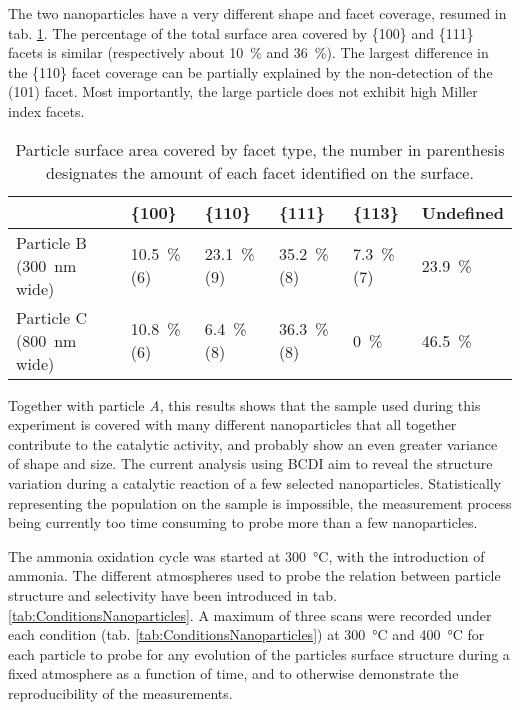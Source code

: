The two nanoparticles have a very different shape and facet coverage, resumed in tab. \ref{tab:FacetCoverage}.
The percentage of the total surface area covered by \{100\} and \{111\} facets is similar (respectively about \qty{10}{\percent} and \qty{36}{\percent}).
The largest difference in the \{110\} facet coverage can be partially explained by the non-detection of the (101) facet.
Most importantly, the large particle does not exhibit high Miller index facets.

\begin{table}[!htb]
    \centering
    \begin{tabular}{@{}llllll@{}}
    \toprule
        & \{100\} & \{110\} & \{111\} & \{113\} & Undefined \\
    \midrule
    Particle B (\qty{300}{\nm} wide) & \qty{10.5}{\percent} (6) & \qty{23.1}{\percent} (9) & \qty{35.2}{\percent} (8) & \qty{7.3}{\percent} (7) & \qty{23.9}{\percent} \\
    Particle C (\qty{800}{\nm} wide) & \qty{10.8}{\percent} (6) &  \qty{6.4}{\percent} (8) & \qty{36.3}{\percent} (8) & \qty{0}{\percent}       & \qty{46.5}{\percent} \\
    \bottomrule
    \end{tabular}%
    \caption{
        Particle surface area covered by facet type, the number in parenthesis designates the amount of each facet identified on the surface.
    }
    \label{tab:FacetCoverage}
\end{table}

Together with particle \textit{A}, this results shows that the sample used during this experiment is covered with many different nanoparticles that all together contribute to the catalytic activity, and probably show an even greater variance of shape and size.
The current analysis using BCDI aim to reveal the structure variation during a catalytic reaction of a few selected nanoparticles.
Statistically representing the population on the sample is impossible, the measurement process being currently too time consuming to probe more than a few nanoparticles.

The ammonia oxidation cycle was started at \qty{300}{\degreeCelsius}, with the introduction of ammonia.
The different atmospheres used to probe the relation between particle structure and selectivity have been introduced in tab. \ref{tab:ConditionsNanoparticles}.
A maximum of three scans were recorded under each condition (tab. \ref{tab:ConditionsNanoparticles}) at \qty{300}{\degreeCelsius} and \qty{400}{\degreeCelsius} for each particle to probe for any evolution of the particles surface structure during a fixed atmosphere as a function of time, and to otherwise demonstrate the reproducibility of the measurements.

